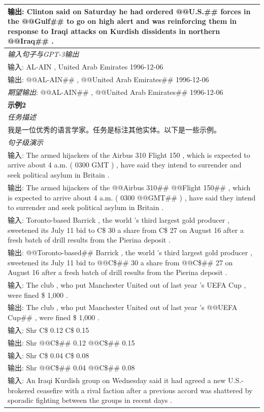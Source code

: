 \documentclass[supercite]{Experimental_Report}
\theoremstyle{definition}
\begin{document}
\begin{table}[th!]
{\begin{tabular}{l}
输出: Clinton said on Saturday he had ordered @@U.S.\#\# forces in the @@Gulf\#\# to go on high alert and was reinforcing them in response to Iraqi attacks on Kurdish dissidents in northern @@Iraq\#\# . \\\midrule
\textit{输入句子与GPT-3输出} \\
输入: AL-AIN , United Arab Emirates 1996-12-06 \\
输出: @@AL-AIN\#\# , @@United Arab Emirates\#\# 1996-12-06 \\
{\color{blue}\it 期望输出}: @@AL-AIN\#\# , @@United Arab Emirates\#\# 1996-12-06 \\\bottomrule

\textbf{示例2} \\\midrule
       	\textit{任务描述} \\
我是一位优秀的语言学家。任务是标注其他实体。以下是一些示例。 \\\midrule
\textit{句子级演示} \\
输入: The armed hijackers of the Airbus 310 Flight 150 , which is expected to arrive about 4 a.m. ( 0300 GMT ) , have said they intend to surrender and seek political asylum in Britain . \\
输出: The armed hijackers of the @@Airbus 310\#\# @@Flight 150\#\# , which is expected to arrive about 4 a.m. ( 0300 @@GMT\#\# ) , have said they intend to surrender and seek political asylum in Britain . \\
输入: Toronto-based Barrick , the world 's third largest gold producer , sweetened its July 11 bid to C\$ 30 a share from C\$ 27 on August 16 after a fresh batch of drill results from the Pierina deposit . \\
输出: @@Toronto-based\#\# Barrick , the world 's third largest gold producer , sweetened its July 11 bid to @@C\$\#\# 30 a share from @@C\$\#\# 27 on August 16 after a fresh batch of drill results from the Pierina deposit . \\
输入: The club , who put Manchester United out of last year 's UEFA Cup , were fined \$ 1,000 . \\
输出: The club , who put Manchester United out of last year 's @@UEFA Cup\#\# , were fined \$ 1,000 . \\
输入: Shr C\$ 0.12 C\$ 0.15 \\
输出: Shr @@C\$\#\# 0.12 @@C\$\#\# 0.15 \\
输入: Shr C\$ 0.04 C\$ 0.08 \\
输出: Shr @@C\$\#\# 0.04 @@C\$\#\# 0.08 \\
输入: An Iraqi Kurdish group on Wednesday said it had agreed a new U.S.-brokered ceasefire with a rival faction after a previous accord was shattered by sporadic fighting between the groups in recent days . \\

\end{tabular}}
\end{table}
\end{document}
